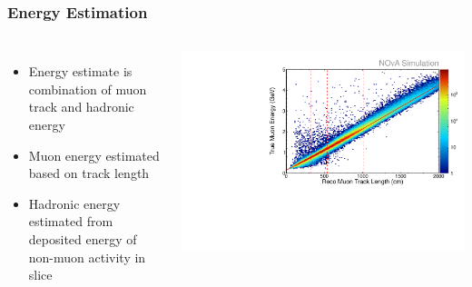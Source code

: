 \documentclass[10pt,professionalfonts,xcolor=table]{beamer}
\begin{document}
\begin{frame}
\frametitle{Energy Estimation}
\begin{columns}[c]
  \begin{itemize}
  \item Energy estimate is combination of muon track and hadronic energy
  \gap
  \item Muon energy estimated based on track length
  \gap
  \item Hadronic energy estimated from deposited energy of non-muon activity in slice

  \end{itemize}

\centering

\includegraphics[height=\textwidth, angle=-90]{figures/plots/reco/numu_energy_muon_fit.pdf}


\end{columns}
\end{frame}
\end{document}
